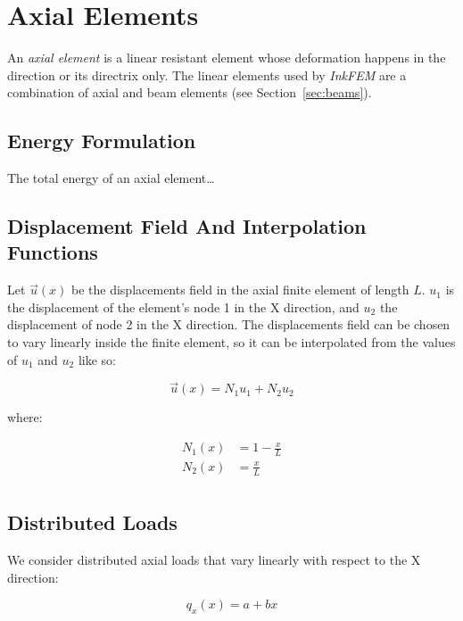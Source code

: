\section{Axial Elements}
\label{sec:axial}

An \emph{axial element} is a linear resistant element whose deformation happens in the direction or its directrix only.
The linear elements used by \emph{InkFEM} are a combination of axial and beam elements (see Section~\ref{sec:beams}).


\subsection{Energy Formulation}

The total energy of an axial element\dots

\subsection{Displacement Field And Interpolation Functions}

Let $\vec{u}(x)$ be the displacements field in the axial finite element of length $L$.
$u_1$ is the displacement of the element's node 1 in the X direction, and $u_2$ the displacement of node 2 in the X direction.
The displacements field can be chosen to vary linearly inside the finite element, so it can be interpolated from the values of $u_1$ and $u_2$ like so:

\begin{equation}
  \vec{u}(x) = N_1 u_1 + N_2 u_2
\end{equation}

where:

\begin{equation}
  \begin{split}
    N_1(x) & = 1 - \frac{x}{L} \\
    N_2(x) & = \frac{x}{L} \\
  \end{split}
\end{equation}


\subsection{Distributed Loads}

We consider distributed axial loads that vary linearly with respect to the X direction:

\begin{equation}
  \label{eq:distributed_linear_load}
  q_x(x) = a + bx
\end{equation}

